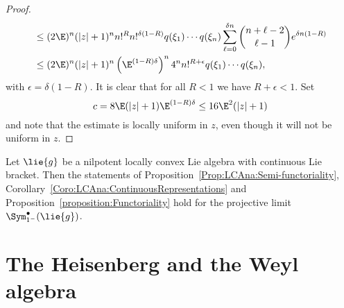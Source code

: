 \begin{proof}
\begin{align*}
        & \leq
        (2 \E)^n (|z| + 1)^n
        n!^R n!^{\delta (1 - R)}
        q(\xi_1) \cdots q(\xi_n)
        \sum\limits_{\ell = 0}^{\delta n}
        \binom{n + \ell - 2}{\ell - 1}
        e^{\delta n (1 - R)}
        \\
        & \leq
        (2 \E)^n (|z| + 1)^n
        \left(\E^{(1-R) \delta}\right)^n
        4^n n!^{R + \epsilon}
        q(\xi_1) \cdots q(\xi_n),
    \end{align*}
    with $\epsilon = \delta (1-R)$. It is clear that for all $R < 1$ we have $R 
    + \epsilon < 1$. Set 
    \begin{equation*}
    	c 
    	= 
    	8 \E (|z|+1) \E^{(1-R)\delta}
    	\leq
    	16 \E^2 (|z|+1)
	\end{equation*}
	and note that the estimate is locally uniform in $z$, even
    though it will not be uniform in $z$.
\end{proof}
\begin{proposition}
	\label{proposition:FunctorialityNilpotent}
	Let $\lie{g}$ be a nilpotent locally convex Lie algebra with continuous Lie 
	bracket. Then the statements of 
	Proposition~\ref{Prop:LCAna:Semi-functoriality}, 
	Corollary~\ref{Coro:LCAna:ContinuousRepresentations} and 
	Proposition~\ref{proposition:Functoriality} hold for the projective limit 
	$\Sym_{1^-}^{\bullet}(\lie{g})$.
\end{proposition}



\section{The Heisenberg and the Weyl algebra}
\label{sec:chap6_HeisenbergWeyl}

